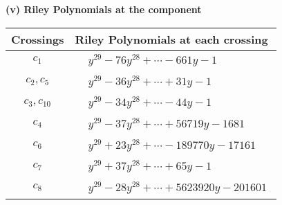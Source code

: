 \documentclass[1p]{elsarticle_modified}
\theoremstyle{definition}
\begin{document}
\newpage\renewcommand{\arraystretch}{1}
\flushleft \textbf{(v) Riley Polynomials at the component}\newline \\
\begin{tabular}{m{50pt}|m{274pt}}
Crossings & \hspace{64pt}Riley Polynomials at each crossing \\
\hline $$\begin{aligned}c_{1}\end{aligned}$$&$\begin{aligned}
&y^{29}-76 y^{28}+\cdots-661 y-1
\end{aligned}$\\
\hline $$\begin{aligned}c_{2},c_{5}\end{aligned}$$&$\begin{aligned}
&y^{29}-36 y^{28}+\cdots+31 y-1
\end{aligned}$\\
\hline $$\begin{aligned}c_{3},c_{10}\end{aligned}$$&$\begin{aligned}
&y^{29}-34 y^{28}+\cdots-44 y-1
\end{aligned}$\\
\hline $$\begin{aligned}c_{4}\end{aligned}$$&$\begin{aligned}
&y^{29}-37 y^{28}+\cdots+56719 y-1681
\end{aligned}$\\
\hline $$\begin{aligned}c_{6}\end{aligned}$$&$\begin{aligned}
&y^{29}+23 y^{28}+\cdots-189770 y-17161
\end{aligned}$\\
\hline $$\begin{aligned}c_{7}\end{aligned}$$&$\begin{aligned}
&y^{29}+37 y^{28}+\cdots+65 y-1
\end{aligned}$\\
\hline $$\begin{aligned}c_{8}\end{aligned}$$&$\begin{aligned}
&y^{29}-28 y^{28}+\cdots+5623920 y-201601
\end{aligned}$\\

\end{tabular}
\end{document}
